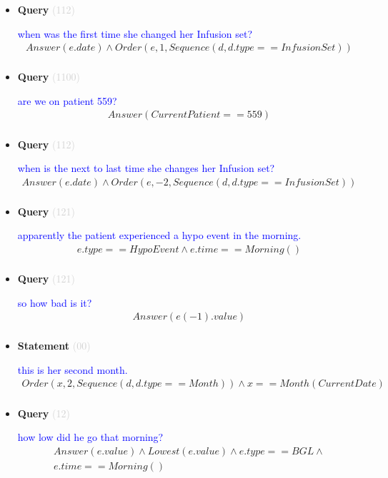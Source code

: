\documentclass[11pt]{article}
\newcommand{\key}[1]{\textcolor{lightgray}{#1}}
\newcounter{CQuery}
\newcounter{CStatement}
\begin{document}
\begin{itemize}
\item
\textbf{Query\theCQuery} \key{(112)} \addtocounter{CQuery}{1}
\textcolor{blue}{ when was the first time she changed her Infusion set? }
\begin{multline*}
Answer(e.date) \wedge Order(e, 1, Sequence(d, d.type==InfusionSet)) \\ 
\end{multline*}


\item
\textbf{Query\theCQuery} \key{(1100)} \addtocounter{CQuery}{1}
\textcolor{blue}{ are we on patient 559? }
\begin{multline*}
Answer(CurrentPatient==559) \\ 
\end{multline*}


\item
\textbf{Query\theCQuery} \key{(112)} \addtocounter{CQuery}{1}
\textcolor{blue}{ when is the next to last time she changes her Infusion set? }
\begin{multline*}
Answer(e.date) \wedge Order(e, -2, Sequence(d, d.type==InfusionSet)) \\ 
\end{multline*}


\item
\textbf{Query\theCQuery} \key{(121)} \addtocounter{CQuery}{1}
\textcolor{blue}{ apparently the patient experienced a hypo event in the morning. }
\begin{multline*}
e.type==HypoEvent \wedge e.time==Morning() \\ 
\end{multline*}


\item
\textbf{Query\theCQuery} \key{(121)} \addtocounter{CQuery}{1}
\textcolor{blue}{ so how bad is it? }
\begin{multline*}
Answer(e(-1).value) \\ 
\end{multline*}


\item
\textbf{Statement\theCStatement} \key{(00)} \addtocounter{CStatement}{1}
\textcolor{blue}{ this is her second month. }
\begin{multline*}
Order(x, 2, Sequence(d, d.type==Month)) \wedge x==Month(CurrentDate) \\ 
\end{multline*}


\item
\textbf{Query\theCQuery} \key{(12)} \addtocounter{CQuery}{1}
\textcolor{blue}{ how low did he go that morning? }
\begin{multline*}
Answer(e.value) \wedge Lowest(e.value) \wedge e.type==BGL \wedge \\ 
e.time==Morning() \\ 
\end{multline*}



\end{itemize}
\end{document}
